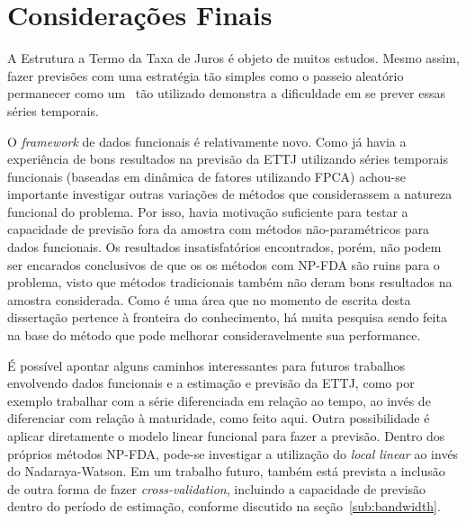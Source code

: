 \documentclass[
	12pt,				%
	openright,			%
	oneside,			%
	a4paper,			%
	english,			%
	brazil				%
	]{dissertacao-ufrgs-abntex2}
\begin{document}

\chapter*[Conclusão]{Considerações Finais} \label{ch:conclusao}

A Estrutura a Termo da Taxa de Juros é objeto de muitos estudos. Mesmo assim, fazer previsões com uma estratégia tão simples como o passeio aleatório permanecer como um \bm~tão utilizado demonstra a dificuldade em se prever essas séries temporais.

O \emph{framework} de dados funcionais é relativamente novo. Como já havia a experiência de bons resultados na previsão da ETTJ utilizando séries temporais funcionais (baseadas em dinâmica de fatores utilizando FPCA) achou-se importante investigar outras variações de métodos que considerassem a natureza funcional do problema. 
Por isso, havia motivação suficiente para testar a capacidade de previsão fora da amostra com métodos não-paramétricos para dados funcionais. 
Os resultados insatisfatórios encontrados, porém, não podem ser encarados conclusivos de que os os métodos com NP-FDA são ruins para o problema, visto que métodos tradicionais também não deram bons resultados na amostra considerada. Como é uma área que no momento de escrita desta dissertação pertence à fronteira do conhecimento, há muita pesquisa sendo feita na base do método que pode melhorar consideravelmente sua performance. 

É possível apontar alguns caminhos interessantes para futuros trabalhos envolvendo dados funcionais e a estimação e previsão da ETTJ, como por exemplo trabalhar com a série diferenciada em relação ao tempo, ao invés de diferenciar com relação à maturidade, como feito aqui. Outra possibilidade é aplicar diretamente o modelo linear funcional para fazer a previsão. Dentro dos próprios métodos NP-FDA, pode-se investigar a utilização do \emph{local linear} ao invés do Nadaraya-Watson. Em um trabalho futuro, também está prevista a inclusão de outra forma de fazer \emph{cross-validation}, incluindo a capacidade de previsão dentro do período de estimação, conforme discutido na seção~\ref{sub:bandwidth}. 
\end{document}
